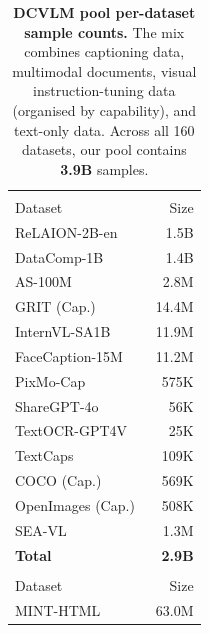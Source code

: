


\begin{table}[!h]
\centering
\caption{\textbf{DCVLM pool per-dataset sample counts.} The mix combines \colorbox{capcolor}{captioning data}, \colorbox{mmdoccolor}{multimodal documents}, \colorbox{instructcolor}{visual instruction-tuning data} (organised by capability), and \colorbox{textcolor}{text-only data}. Across all 160 datasets, our pool contains \textbf{3.9B} samples.}
\label{tab:dcvlm-datamix-samples}
\scriptsize
\setlength{\tabcolsep}{1.2pt}
\renewcommand{\arraystretch}{1.05}
\begin{minipage}[t]{0.245\textwidth}
\centering
\begin{tabular}{lr}
\toprule
\rowcolor{capcolor}\multicolumn{2}{l}{\textit{Captioning}} \\
Dataset & Size \\
\midrule
ReLAION-2B-en~\cite{schuhmann2022laion} & 1.5B \\
DataComp-1B~\cite{gadre2023datacomp} & 1.4B \\
AS-100M~\cite{wang2024allseeing} & 2.8M \\
GRIT (Cap.)~\cite{peng2023kosmos2} & 14.4M \\
InternVL-SA1B~\cite{chen2024internvl} & 11.9M \\
FaceCaption-15M~\cite{dai2024facecaption} & 11.2M \\
PixMo-Cap~\cite{deitke2025molmo} & 575K \\
ShareGPT-4o~\cite{chen2024sharegpt4v} & 56K \\
TextOCR-GPT4V~\cite{carter2024textocrgpt4v} & 25K \\
TextCaps~\cite{sidorov2020textcaps} & 109K \\
COCO (Cap.)~\cite{chen2015cococaptions} & 569K \\
OpenImages (Cap.)~\cite{kuznetsova2020openimages} & 508K \\
SEA-VL~\cite{cahyawijaya2025seavl} & 1.3M \\
\midrule
\textbf{Total} & \textbf{2.9B} \\
\midrule
\rowcolor{mmdoccolor}\multicolumn{2}{l}{\textit{Multimodal Docs}} \\
Dataset & Size \\
\midrule
MINT-HTML~\cite{awadalla2024mint} & 63.0M \\

\end{tabular}
\end{minipage}
\end{table}
